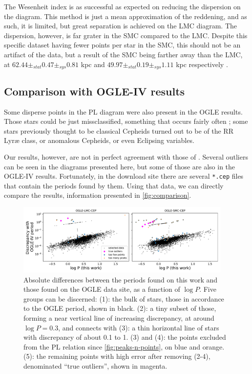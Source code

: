 The Wesenheit index is as successful as expected on reducing the dispersion on the diagram.
This method is just a mean approximation of the reddening, and as such, it is limited, but great separation is achieved on the LMC diagram.
The dispersion, however, is far grater in the SMC compared to the LMC. 
Despite this specific dataset having fewer points per star in the SMC, this should not be an artifact of the data, 
but a result of the SMC being farther away than the LMC, at $62.44 \pm_{stat} 0.47 \pm_{sys}0.81$ kpc 
and $49.97 \pm_{stat} 0.19 \pm_{sys} 1.11$ kpc respectively \citep{SMC2020,LMC2013}.

\subsection{Comparison with OGLE-IV results}


Some disperse points in the PL diagram were also present in the OGLE results. 
Those stars could be just missclassified, something that occurs fairly often \citep[see for example Table 1 of][]{OGLE2016};
some stars previously thought to be classical Cepheids turned out to be of the RR Lyr\ae{} class,
or anomalous Cepheids, or even Eclipsing variables.

Our results, however, are not in perfect agreement with those of \cite{OGLE2016}.
Several outliers can be seen in the diagrams presented here, but some of those are also in the OGLE-IV results.
Fortunately, in the download site there are several \texttt{*.cep} files that contain the periods found by them.
Using that data, we can directly compare the results, information presented in \autoref{fig:comparison}.

\begin{figure}
	\centering
	\includegraphics[width=0.95\textwidth]{img/discrepancies.pdf}
	\caption[Results: comparison with OGLE-IV periods]{
		Absolute differences between the periods found on this work and those found on the OGLE data site, as a function of $\log P$.
		Five groups can be discerned: (1): the bulk of stars, those in accordance to the OGLE period, shown in black. 
		(2): a tiny subset of those, forming a near vertical line of increasing discrepancy, at around  $\log P = 0.3$, and connects with
		(3): a thin horizontal line of stars with discrepancy of about 0.1 to 1.
		(3) and (4): the points excluded from the PL relation since \autoref{fig:peaks-n-points}, on blue and orange.
		(5): the remaining points with high error after removing (2-4), denominated \enquote{true outliers}, shown in magenta.
	}
	\label{fig:comparison}
\end{figure}

